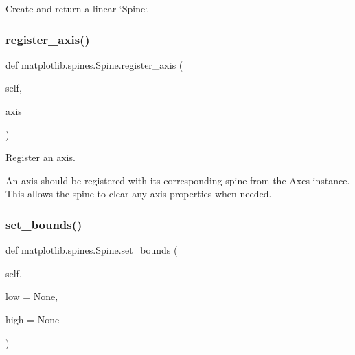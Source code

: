 \begin{DoxyVerb}Create and return a linear `Spine`.\end{DoxyVerb}
 \mbox{\label{classmatplotlib_1_1spines_1_1Spine_a30131be5f0620f9ba175898d3010fb95}} 
\subsubsection{\texorpdfstring{register\+\_\+axis()}{register\_axis()}}
{\footnotesize\ttfamily def matplotlib.\+spines.\+Spine.\+register\+\_\+axis (\begin{DoxyParamCaption}\item[{}]{self,  }\item[{}]{axis }\end{DoxyParamCaption})}

\begin{DoxyVerb}Register an axis.

An axis should be registered with its corresponding spine from
the Axes instance. This allows the spine to clear any axis
properties when needed.
\end{DoxyVerb}
 \mbox{\label{classmatplotlib_1_1spines_1_1Spine_af4ff86391ad667e80f77b21796c85939}} 
\subsubsection{\texorpdfstring{set\+\_\+bounds()}{set\_bounds()}}
{\footnotesize\ttfamily def matplotlib.\+spines.\+Spine.\+set\+\_\+bounds (\begin{DoxyParamCaption}\item[{}]{self,  }\item[{}]{low = {\ttfamily None},  }\item[{}]{high = {\ttfamily None} }\end{DoxyParamCaption})}

